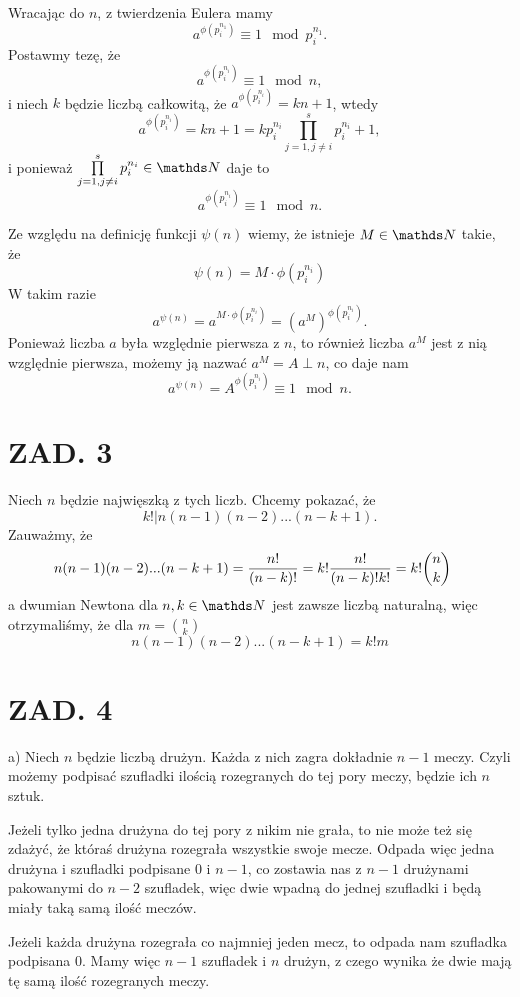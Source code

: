 \documentclass{article}[13pt]
\begin{document}
\bigskip

Wracając do $n$, z twierdzenia Eulera mamy
$$a^{\phi(p_i^{n_1})}\equiv 1\mod p_i^{n_1}.$$
Postawmy tezę, że
$$a^{\phi(p_i^{n_i})}\equiv 1\mod n,$$
i niech $k$ będzie liczbą całkowitą, że $a^{\phi(p_i^{n_i})}=kn+1$, wtedy
$$a^{\phi(p_i^{n_i})}=kn+1=kp_i^{n_i}\prod\limits_{j=1,j\neq i}^sp_i^{n_i}+1,$$
i ponieważ $\prod\limits_{j=1,j\neq i}^sp_i^{n_i}\in\N$ daje to
$$a^{\phi(p_i^{n_i})}\equiv 1\mod n.$$
\bigskip

Ze względu na definicję funkcji $\psi(n)$ wiemy, że istnieje $M\in\N$ takie, że
$$\psi(n)=M\cdot \phi(p_i^{n_i})$$
W takim razie
$$a^{\psi(n)}=a^{M\cdot\phi(p_i^{n_i})}=(a^M)^{\phi(p_i^{n_i})}.$$
Ponieważ liczba $a$ była względnie pierwsza z $n$, to również liczba $a^M$ jest z nią względnie pierwsza, możemy ją nazwać $a^M=A\perp n$, co daje nam
$$a^{\psi(n)}=A^{\phi(p_i^{n_i})}\equiv 1\mod n.$$

\section*{ZAD. 3}

Niech $n$ będzie najwięszką z tych liczb. Chcemy pokazać, że
$$k!|n(n-1)(n-2)...(n-k+1).$$
Zauważmy, że
\begin{align*}
    n(n-1)(n-2)...(n-k+1)&={n!\over(n-k)!}=k!{n!\over(n-k)!k!}=k!{n\choose k}
\end{align*}
a dwumian Newtona dla $n,k\in\N$ jest zawsze liczbą naturalną, więc otrzymaliśmy, że dla $m={n\choose k}$
$$n(n-1)(n-2)...(n-k+1)=k!m$$

\section*{ZAD. 4}

{\color{acc}a)} Niech $n$ będzie liczbą drużyn. Każda z nich zagra dokładnie $n-1$ meczy. Czyli możemy podpisać szufladki ilością rozegranych do tej pory meczy, będzie ich $n$ sztuk. 
\smallskip

Jeżeli tylko jedna drużyna do tej pory z nikim nie grała, to nie może też się zdażyć, że któraś drużyna rozegrała wszystkie swoje mecze. Odpada więc jedna drużyna i szufladki podpisane 0 i $n-1$, co zostawia nas z $n-1$ drużynami pakowanymi do $n-2$ szufladek, więc dwie wpadną do jednej szufladki i będą miały taką samą ilość meczów.
\smallskip

Jeżeli każda drużyna rozegrała co najmniej jeden mecz, to odpada nam szufladka podpisana 0. Mamy więc $n-1$ szufladek i $n$ drużyn, z czego wynika że dwie mają tę samą ilość rozegranych meczy.
\medskip
\end{document}
